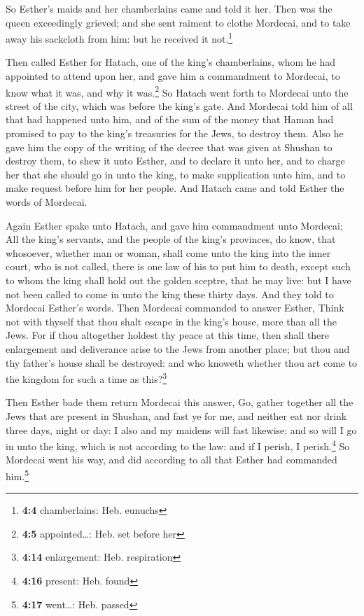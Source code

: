  So Esther's maids and her chamberlains came and told it
her. Then was the queen exceedingly grieved; and she sent raiment to
clothe Mordecai, and to take away his sackcloth from him: but he
received it not.\footnote{\textbf{4:4} chamberlains: Heb. eunuchs}

 Then called Esther for Hatach, one of the king's
chamberlains, whom he had appointed to attend upon her, and gave him a
commandment to Mordecai, to know what it was, and why it was.\footnote{\textbf{4:5}
  appointed\ldots: Heb. set before her}  So Hatach went
forth to Mordecai unto the street of the city, which was before the
king's gate.  And Mordecai told him of all that had
happened unto him, and of the sum of the money that Haman had promised
to pay to the king's treasuries for the Jews, to destroy them.
 Also he gave him the copy of the writing of the decree
that was given at Shushan to destroy them, to shew it unto Esther, and
to declare it unto her, and to charge her that she should go in unto the
king, to make supplication unto him, and to make request before him for
her people.  And Hatach came and told Esther the words of
Mordecai.

 Again Esther spake unto Hatach, and gave him commandment
unto Mordecai;  All the king's servants, and the people
of the king's provinces, do know, that whosoever, whether man or woman,
shall come unto the king into the inner court, who is not called, there
is one law of his to put him to death, except such to whom the king
shall hold out the golden sceptre, that he may live: but I have not been
called to come in unto the king these thirty days.  And
they told to Mordecai Esther's words.  Then Mordecai
commanded to answer Esther, Think not with thyself that thou shalt
escape in the king's house, more than all the Jews.  For
if thou altogether holdest thy peace at this time, then shall there
enlargement and deliverance arise to the Jews from another place; but
thou and thy father's house shall be destroyed: and who knoweth whether
thou art come to the kingdom for such a time as this?\footnote{\textbf{4:14}
  enlargement: Heb. respiration}

 Then Esther bade them return Mordecai this answer,
 Go, gather together all the Jews that are present in
Shushan, and fast ye for me, and neither eat nor drink three days, night
or day: I also and my maidens will fast likewise; and so will I go in
unto the king, which is not according to the law: and if I perish, I
perish.\footnote{\textbf{4:16} present: Heb. found}  So
Mordecai went his way, and did according to all that Esther had
commanded him.\footnote{\textbf{4:17} went\ldots: Heb. passed}

